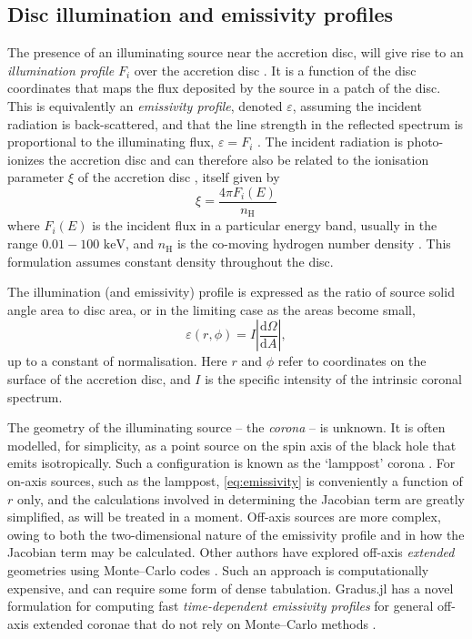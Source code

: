 \documentclass[fleqn,usenatbib]{mnras}
\newcommand{\software}[1]{{\sc #1}}
\newcommand{\Gradus}{\software{Gradus.jl}\xspace}
\renewcommand{\d}{\text{d}}
\begin{document}
\subsection{Disc illumination and emissivity profiles}
\label{sec:emissivity-profiles}

The presence of an illuminating source near the accretion disc, will give rise
to an \emph{illumination profile} $F_i$ over the accretion disc
\citep{svensson_corona_1994}. It is a function of the disc coordinates that maps
the flux deposited by the source in a patch of the disc. This is equivalently an
\emph{emissivity profile}, denoted $\varepsilon$, assuming the incident
radiation is back-scattered, and that the line strength in the reflected
spectrum is proportional to the illuminating flux, $\varepsilon = F_i$
\citep{wilkins_understanding_2012}. The incident radiation is photo-ionizes the
accretion disc and can therefore also be related to the ionisation parameter
$\xi$ of the accretion disc \citep{laor_line_1991,ross_effects_1993}, itself
given by
\begin{equation}
    \xi = \frac{4 \pi F_i (E)}{n_\text{H}}
\end{equation}
where $F_i (E)$ is the incident flux in a particular energy band, usually in the
range $0.01 - 100 \text{ keV}$, and $n_\text{H}$ is the co-moving hydrogen
number density \citep{ross_effects_1993}. This formulation assumes constant
density throughout the disc.

The illumination (and emissivity) profile is expressed as the ratio of source
solid angle area to disc area, or in the limiting case as the areas become
small,
\begin{equation}
    \varepsilon (r, \phi) = I \left\lvert \frac{\d \Omega}{\d A} \right\rvert,
\end{equation} \label{eq:emissivity}
up to a constant of normalisation.
Here $r$ and $\phi$ refer to coordinates on the surface of the accretion disc,
and $I$ is the specific intensity of the intrinsic coronal spectrum.

The geometry of the illuminating source -- the \emph{corona} -- is unknown. It
is often modelled, for simplicity, as a point source on the spin axis of the
black hole that emits isotropically. Such a configuration is known as the
`lamppost' corona \citep[e.g.][]{fukumura_accretion_2007}. For on-axis sources,
such as the lamppost, \eqref{eq:emissivity} is conveniently a function of $r$
only, and the calculations involved in determining the Jacobian term are greatly
simplified, as will be treated in a moment. Off-axis sources are more complex,
owing to both the two-dimensional nature of the emissivity profile and in how
the Jacobian term may be calculated. Other authors have explored off-axis
\emph{extended} geometries using Monte--Carlo codes
\citep{wilkins_understanding_2012, wilkins_towards_2016, gonzalez_probing_2017}.
Such an approach is computationally expensive, and can require some form of
dense tabulation. \Gradus has a novel formulation for computing fast
\emph{time-dependent emissivity profiles} for general off-axis extended coronae
that do not rely on Monte--Carlo methods \citep{baker_2025}.
\end{document}
